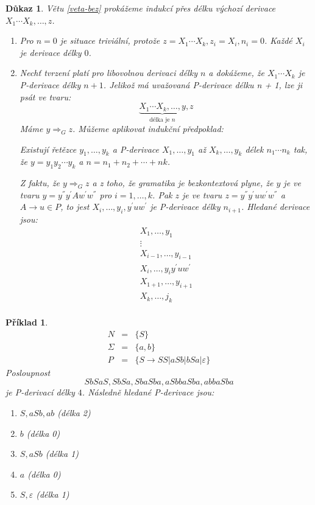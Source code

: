 \documentclass[10pt, a4paper, titlepage]{article}
\theoremstyle{note}
\newtheorem{dukaz}{Důkaz}
\newtheorem{priklad}{Příklad}
\begin{document}
\begin{dukaz}
Větu \ref{veta-bez} prokážeme indukcí přes délku výchozí derivace $X_{1} \cdots X_{k}, \ldots, z$.
\begin{enumerate}
\item
Pro $n = 0$ je situace triviální, protože $z = X_{1} \cdots X_{k}, z_{i} = X_{i}, n_{i} = 0$. Každé $X_{i}$ je derivace délky $0$.

\item
Nechť tvrzení platí pro libovolnou derivaci délky $n$ a dokážeme, že $X_{1} \cdots X_{k}$ je P-derivace délky $n + 1$.
Jelikož má uvažovaná P-derivace délku n + 1, lze ji psát ve tvaru:
$$
\underbrace {X_{1} \cdots X_{k}, \ldots, y}_{\text{délka je } n}, z
$$
Máme $y \Rightarrow_{G}z$. Můžeme aplikovat indukční předpoklad:

Existují řetězce $y_{1}, \ldots, y_{k}$ a P-derivace $X_{1}, \ldots, y_{1}$ až $X_{k}, \ldots, y_{k}$ 
délek $n_{1} \cdots n_{k}$ tak, že $y = y_{1} y_{2} \cdots y_{k}$ a $n = n_{1} + n_{2} + \cdots + n{k}$. 

Z faktu, že $y  \Rightarrow_{G}z$ a z toho, že gramatika je bezkontextová plyne, že $y$ je ve tvaru 
$y = y^{''} y^{'} A w^{'} w^{''}$ pro $i = 1, \ldots, k$. Pak $z$ je ve tvaru $z = y^{''} y^{'} u w^{'} w^{''}$ a $A \rightarrow u \in P$,
to jest $X_{i}, \ldots, y_{i}, y^{'} u w^{'}$ je P-derivace délky $n_{i+1}$. Hledané derivace jsou:
\begin{gather*}
X_{1}, \ldots, y_{1} \\
\vdots \\
X_{i-1}, \ldots, y_{i-1} \\
X_{i}, \ldots, y_{i} y^{'} u w^{'} \\
X_{1+1}, \ldots, y_{i+1} \\
X_{k}, \ldots, j_{k} \\ %
\end{gather*}
\end{enumerate}
\end{dukaz}

\begin{priklad}
\begin{eqnarray*}
N &=& \lbrace S \rbrace \\
\Sigma &=& \lbrace a, b \rbrace \\
P &=& \lbrace S \rightarrow SS|aSb|bSa| \varepsilon \rbrace
\end{eqnarray*}
Posloupnost
$$
SbSaS, SbSa, SbaSba, aSbbaSba , abbaSba
$$
je P-derivací délky $4$.
Následně hledané P-derivace jsou:
\begin{enumerate}
\item
$S, aSb, ab$ (délka 2)
\item
$b$ (délka 0)
\item
$S, aSb$ (délka 1)
\item
$a$ (délka 0)
\item
$S, \varepsilon $ (délka 1)
\end{enumerate}
\end{priklad}
\end{document}
